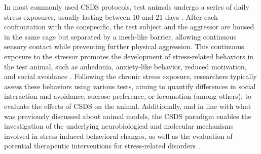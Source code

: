 In most commonly used CSDS protocols, test animals undergo a series of daily stress exposures, usually lasting between 10 and 21 days \cite{Golden2011AMice}. After each confrontation with the conspecific, the test subject and the aggressor are housed in the same cage but separated by a mesh-like barrier, allowing continuous sensory contact while preventing further physical aggression. This continuous exposure to the stressor promotes the development of stress-related behaviors in the test animal, such as anhedonia, anxiety-like behavior, reduced motivation, and social avoidance \cite{Kudryavtseva1991SocialStrain, Iniguez2014SocialMice, Yoshida2021ChronicMice}. Following the chronic stress exposure, researchers typically assess these behaviors using various tests, aiming to quantify differences in social interaction and avoidance, sucrose preference, or locomotion (among others), to evaluate the effects of CSDS on the animal. Additionally, and in line with what was previously discussed about animal models, the CSDS paradigm enables the investigation of the underlying neurobiological and molecular mechanisms involved in stress-induced behavioral changes, as well as the evaluation of potential therapeutic interventions for stress-related disorders \cite{Donahue2014EffectsMice, Lopez2022KetamineKcnq2}.

